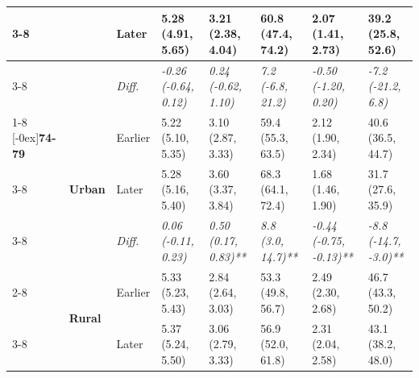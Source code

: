 \documentclass[12pt, a4paper]{article}
\begin{document}
\begin{appendices}
\begin{table}[!p]
{\begin{tabular}[t]{>{}l>{}lllllll}
        \cmidrule{3-8}
                                              &                                 & Later                         & 5.28 (4.91, 5.65)                           & 3.21 (2.38, 4.04)                            & 60.8 (47.4, 74.2)                           & 2.07 (1.41, 2.73)                               & 39.2 (25.8, 52.6)                              \\
        \cmidrule{3-8}
                                              &                                 & \cellcolor{gray!10}\em{Diff.} & \cellcolor{gray!10}\em{-0.26 (-0.64, 0.12)} & \cellcolor{gray!10}\em{0.24 (-0.62, 1.10)}   & \cellcolor{gray!10}\em{7.2 (-6.8, 21.2)}    & \cellcolor{gray!10}\em{-0.50 (-1.20, 0.20)}     & \cellcolor{gray!10}\em{-7.2 (-21.2, 6.8)}      \\
        \cmidrule{1-8}
        \multirow{9}{*}[-0ex]{\textbf{74-79}} & \multirow{3}{*}{\textbf{Urban}} & Earlier                       & 5.22 (5.10, 5.35)                           & 3.10 (2.87, 3.33)                            & 59.4 (55.3, 63.5)                           & 2.12 (1.90, 2.34)                               & 40.6 (36.5, 44.7)                              \\
        \cmidrule{3-8}
                                              &                                 & Later                         & 5.28 (5.16, 5.40)                           & 3.60 (3.37, 3.84)                            & 68.3 (64.1, 72.4)                           & 1.68 (1.46, 1.90)                               & 31.7 (27.6, 35.9)                              \\
        \cmidrule{3-8}
                                              &                                 & \cellcolor{gray!10}\em{Diff.} & \cellcolor{gray!10}\em{0.06 (-0.11, 0.23)}  & \cellcolor{gray!10}\em{0.50 (0.17, 0.83)**}  & \cellcolor{gray!10}\em{8.8 (3.0, 14.7)**}   & \cellcolor{gray!10}\em{-0.44 (-0.75, -0.13)**}  & \cellcolor{gray!10}\em{-8.8 (-14.7, -3.0)**}   \\
        \cmidrule{2-8}
                                              & \multirow{3}{*}{\textbf{Rural}} & Earlier                       & 5.33 (5.23, 5.43)                           & 2.84 (2.64, 3.03)                            & 53.3 (49.8, 56.7)                           & 2.49 (2.30, 2.68)                               & 46.7 (43.3, 50.2)                              \\
        \cmidrule{3-8}
                                              &                                 & Later                         & 5.37 (5.24, 5.50)                           & 3.06 (2.79, 3.33)                            & 56.9 (52.0, 61.8)                           & 2.31 (2.04, 2.58)                               & 43.1 (38.2, 48.0)                              \\

\end{tabular}}
\end{table}
\end{appendices}
\end{document}

